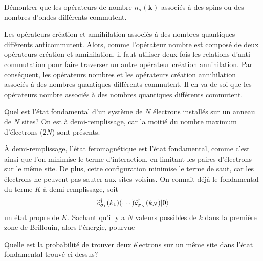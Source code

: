 \documentclass{subfiles}[../main.tex]
\begin{document}
            \begin{problem}
                Démontrer que les opérateurs de nombre
                $n_\sigma(\bm{k})$ associés à des spins ou
                des nombres d'ondes différents commutent.
            \end{problem}
            Les opérateurs création et annihilation associés à des nombres
            quantiques différents
            anticommutent. Alors, comme l'opérateur
            nombre est composé de deux opérateurs création et annihilation,
            il faut utiliser deux fois les relations d'anti-commutation pour
            faire traverser un autre opérateur création annihilation. Par
            conséquent, les opérateurs nombres et les opérateurs création
            annihilation associés à des nombres quantiques différents commutent.
            Il en va de soi que les opérateurs nombre associés à des nombres
            quantiques différents commutent.

            \begin{problem}
                Quel est l'état fondamental d'un système de
                $N$ électrons installés sur un anneau de
                $N$ sites? On est à demi-remplissage, car
                la moitié du nombre maximum d'électrons ($2N$) sont présents.
            \end{problem}
            À demi-remplissage, l'état feromagnétique est l'état fondamental,
            comme c'est ainsi que l'on minimise le terme d'interaction, en
            limitant les paires d'électrons sur le même site. De plus, cette
            configuration minimise le terme de saut, car les électrons ne
            peuvent pas sauter aux sites voisins. On connait déjà le
            fondamental du terme $K$ à demi-remplissage, soit
            \begin{align}
                \widetilde{c}^\dagger_{\sigma_1}(k_1)(\cdots)
                \widetilde{c}^\dagger_{\sigma_N}(k_N)|{0}\rangle
            \end{align}
            un état propre de $K$. Sachant qu'il y a $N$ valeurs possibles de
            $k$ dans la première zone de Brillouin, alors l'énergie, pourvue

            \begin{problem}
                Quelle est la probabilité de trouver deux électrons sur un même
                site dans l'état fondamental trouvé ci-dessus?
            \end{problem}
\end{document}
